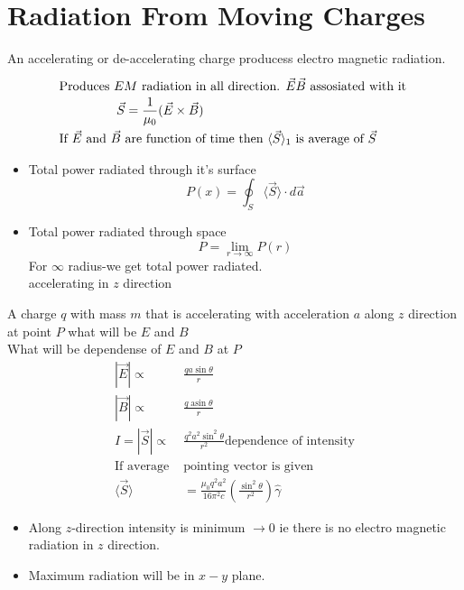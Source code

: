 \section{Radiation From Moving Charges}
An accelerating or de-accelerating charge producess electro magnetic radiation.
\begin{align*}
\intertext{Produces $EM$ radiation in all direction. $\vec{E}\vec{B}$ assosiated with it }
\vec{S}&=\frac{1}{\mu_{0}}(\vec{E} \times \vec{B})\\
\text{If $\vec{E}$ and $\vec{B}$ }&\text{are function of time then $\langle\vec{S}\rangle_{1}$ is average of $\vec{S}$}
\end{align*}
\begin{itemize}
	\item Total power radiated through it's surface
	$$P(x)=\oint_{S}\langle\vec{S}\rangle \cdot d \vec{a}$$
	\item Total power radiated through space
	$$P=\lim _{r \rightarrow \infty} P(r)$$
	For $\infty$ radius-we get total power radiated.\\
	accelerating in $z$ direction
\end{itemize}
A charge $q$ with mass $m$ that is accelerating with acceleration $a$ along $z$ direction at point $P$ what will be $E$ and $B$\\
What will be dependense of $E$ and $B$ at $P$
\begin{align*}
|\vec{E}| \propto &\frac{q a \sin \theta}{r}\\
|\vec{B}| \propto &\frac{q \operatorname{asin} \theta}{r}\\
I=|\vec{S}| \propto& \frac{q^{2} a^{2} \sin ^{2} \theta}{r^{2}}\text{dependence of intensity}\\
\text{If average }&\text{pointing vector is given}\\
\langle\vec{S}\rangle&=\frac{\mu_{0} q^{2} a^{2}}{16 \pi^{2} c}\left(\frac{\sin ^{2} \theta}{r^{2}}\right) \hat{\gamma}
\end{align*}
\begin{itemize}
	\item Along $z$-direction intensity is minimum $\rightarrow 0$ ie there is no electro magnetic radiation in $z$ direction. 
	\item Maximum radiation will be in $x-y$ plane.
\end{itemize}
